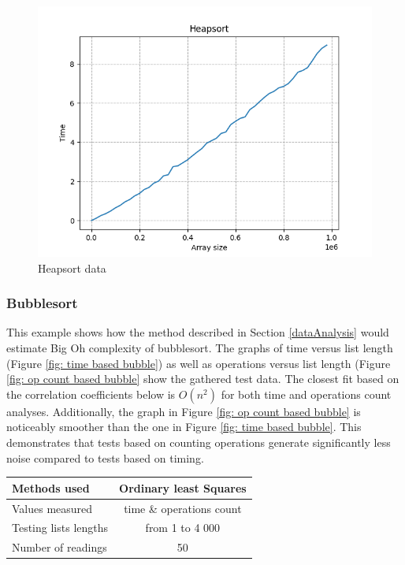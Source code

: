 \documentclass{article}
\begin{document}
            \begin{minipage}{0.6\textwidth}
            \begin{figure}[H]
                    \includegraphics[scale=0.58, right]{images/heapsort_grid_1mil_50readingsv2.png}
                    \caption{Heapsort data}
                    \label{fig: heapsort}
            \end{figure}
            \end{minipage}

            \subsubsection{Bubblesort}
                This example shows how the method described in Section \ref{dataAnalysis} would estimate Big Oh complexity of bubblesort. The graphs of time versus list length (Figure \ref{fig: time based bubble}) as well as operations versus list length (Figure \ref{fig: op count based bubble} show the gathered test data. The closest fit based on the correlation coefficients below is $O(n^2)$ for both time and operations count analyses. Additionally, the graph in Figure \ref{fig: op count based bubble} is noticeably smoother than the one in Figure \ref{fig: time based bubble}. This demonstrates that tests based on counting operations generate significantly less noise compared to tests based on timing.\\
        \begin{center}

            \begin{tabular}{|l|c|}
                \hline
                Methods used & Ordinary least Squares \\
                \hline
                Values measured & time \& operations count \\
                \hline
                Testing lists lengths &  from 1 to 4 000\\
                \hline
                Number of readings & 50 \\
                \hline
            \end{tabular}
        \end{center}
        
\end{document}
